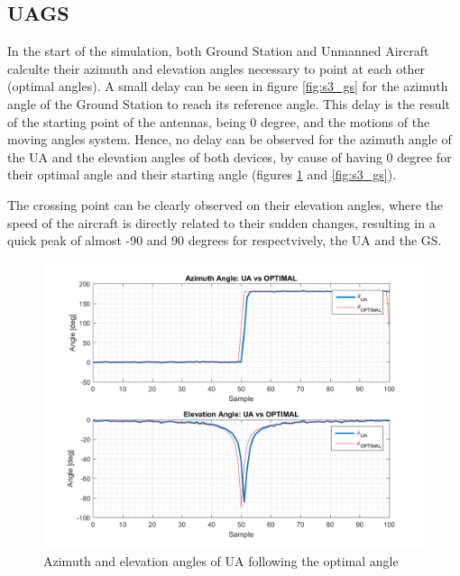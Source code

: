 \subsection{UAGS}
In the start of the simulation, both Ground Station and Unmanned Aircraft calculte their azimuth and elevation angles necessary to point at each other (optimal angles). A small delay can be seen in figure \ref{fig:s3_gs} for the azimuth angle of the Ground Station to reach its reference angle. This delay is the result of the starting point of the antennas, being 0 degree, and the motions of the moving angles system. Hence, no delay can be observed for the azimuth angle of the UA and the elevation angles of both devices, by cause of having 0 degree for their optimal angle and their starting angle (figures \ref{fig:s3_ua} and \ref{fig:s3_gs}).

The crossing point can be clearly observed on their elevation angles, where the speed of the aircraft is directly related to their sudden changes, resulting in a quick peak of almost -90 and 90 degrees for respectvively, the UA and the GS. 

\begin{figure}[H]
	\centering
	\includegraphics[scale=0.75]{figures/s3_ua.png}
	\caption{Azimuth and elevation angles of UA following the optimal angle}
	\label{fig:s3_ua}
\end{figure}



